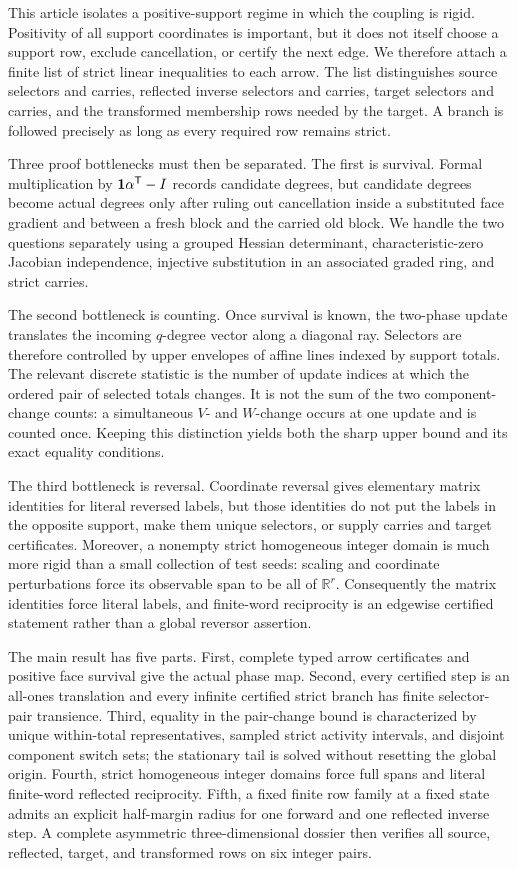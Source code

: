 \documentclass[11pt]{article}
\theoremstyle{definition}
\theoremstyle{remark}
\begin{document}
This article isolates a positive-support regime in which the coupling is
rigid.  Positivity of all support coordinates is important, but it does not
itself choose a support row, exclude cancellation, or certify the next
edge.  We therefore attach a finite list of strict linear inequalities to
each arrow.  The list distinguishes source selectors and carries,
reflected inverse selectors and carries, target selectors and carries, and
the transformed membership rows needed by the target.  A branch is followed
precisely as long as every required row remains strict.

Three proof bottlenecks must then be separated.  The first is survival.
Formal multiplication by \(\mathbf{1}\alpha^{\mathsf{T}}-I\) records candidate
degrees, but candidate degrees become actual degrees only after ruling out
cancellation inside a substituted face gradient and between a fresh block
and the carried old block.  We handle the two questions separately using a
grouped Hessian determinant, characteristic-zero Jacobian independence,
injective substitution in an associated graded ring, and strict carries.

The second bottleneck is counting.  Once survival is known, the two-phase
update translates the incoming \(q\)-degree vector along a diagonal ray.
Selectors are therefore controlled by upper envelopes of affine lines
indexed by support totals.  The relevant discrete statistic is the number
of update indices at which the ordered pair of selected totals changes.
It is not the sum of the two component-change counts: a simultaneous
\(V\)- and \(W\)-change occurs at one update and is counted once.  Keeping
this distinction yields both the sharp upper bound and its exact equality
conditions.

The third bottleneck is reversal.  Coordinate reversal gives elementary
matrix identities for literal reversed labels, but those identities do not
put the labels in the opposite support, make them unique selectors, or
supply carries and target certificates.  Moreover, a nonempty strict
homogeneous integer domain is much more rigid than a small collection of
test seeds: scaling and coordinate perturbations force its observable
span to be all of \(\mathbb R^r\).  Consequently the matrix identities force
literal labels, and finite-word reciprocity is an edgewise certified
statement rather than a global reversor assertion.

The main result has five parts.  First, complete typed arrow certificates
and positive face survival give the actual phase map.  Second, every
certified step is an all-ones translation and every infinite certified
strict branch has finite selector-pair transience.  Third, equality in the
pair-change bound is characterized by unique within-total representatives,
sampled strict activity intervals, and disjoint component switch sets; the
stationary tail is solved without resetting the global origin.  Fourth,
strict homogeneous integer domains force full spans and literal
finite-word reflected reciprocity.  Fifth, a fixed finite row family at a
fixed state admits an explicit half-margin radius for one forward and one
reflected inverse step.  A complete asymmetric three-dimensional dossier
then verifies all source, reflected, target, and transformed rows on six
integer pairs.
\end{document}
